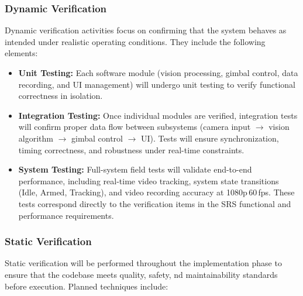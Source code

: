 \documentclass[12pt, titlepage]{article}
\begin{document}
\subsubsection*{Dynamic Verification}
Dynamic verification activities focus on confirming that the system 
behaves as intended under realistic operating conditions. 
They include the following elements:

\begin{itemize}
    \item \textbf{Unit Testing:}  
    Each software module (vision processing, gimbal control, data 
    recording, and UI management) will undergo unit testing to verify
     functional correctness in isolation. 

    \item \textbf{Integration Testing:}  
    Once individual modules are verified, integration tests will 
    confirm proper data flow between subsystems (camera input 
    $\rightarrow$ vision algorithm $\rightarrow$ gimbal control 
    $\rightarrow$ UI).  
    Tests will ensure synchronization, timing correctness, and 
    robustness under real-time constraints.

    \item \textbf{System Testing:}  
    Full-system field tests will validate end-to-end performance, 
    including real-time video tracking, system state transitions 
    (Idle, Armed, Tracking), and video recording accuracy at 1080p\,60\,fps. 
    These tests correspond directly to the verification items in 
    the SRS functional and performance requirements.
\end{itemize}

\subsubsection*{Static Verification}
Static verification will be performed throughout the implementation 
phase to ensure that the codebase meets quality, safety, 
nd maintainability standards before execution. 
Planned techniques include:
\end{document}
